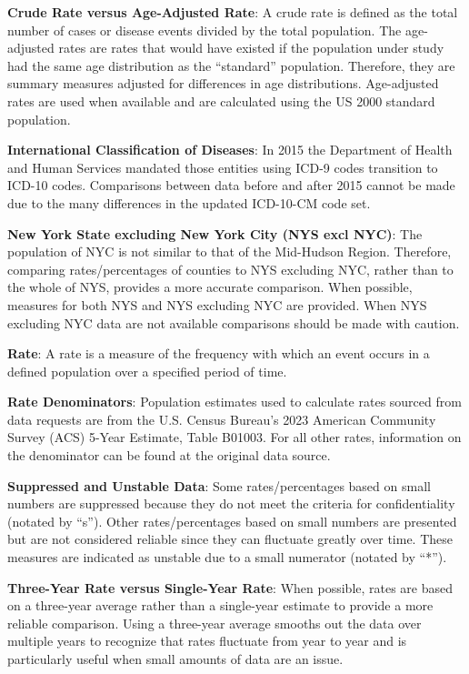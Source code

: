 \documentclass[
  english,
  letterpaper,
]{report}
\begin{document}
\textbf{Crude Rate versus Age-Adjusted Rate}: A crude rate is defined as
the total number of cases or disease events divided by the total
population. The age-adjusted rates are rates that would have existed if
the population under study had the same age distribution as the
``standard'' population. Therefore, they are summary measures adjusted
for differences in age distributions. Age-adjusted rates are used when
available and are calculated using the US 2000 standard population.

\textbf{International Classification of Diseases}: In 2015 the
Department of Health and Human Services mandated those entities using
ICD-9 codes transition to ICD-10 codes. Comparisons between data before
and after 2015 cannot be made due to the many differences in the updated
ICD-10-CM code set.

\textbf{New York State excluding New York City (NYS excl NYC)}: The
population of NYC is not similar to that of the Mid-Hudson Region.
Therefore, comparing rates/percentages of counties to NYS excluding NYC,
rather than to the whole of NYS, provides a more accurate comparison.
When possible, measures for both NYS and NYS excluding NYC are provided.
When NYS excluding NYC data are not available comparisons should be made
with caution.

\textbf{Rate}: A rate is a measure of the frequency with which an event
occurs in a defined population over a specified period of time.

\textbf{Rate Denominators}: Population estimates used to calculate rates
sourced from data requests are from the U.S. Census Bureau's 2023
American Community Survey (ACS) 5-Year Estimate, Table B01003. For all
other rates, information on the denominator can be found at the original
data source.

\textbf{Suppressed and Unstable Data}: Some rates/percentages based on
small numbers are suppressed because they do not meet the criteria for
confidentiality (notated by ``s''). Other rates/percentages based on
small numbers are presented but are not considered reliable since they
can fluctuate greatly over time. These measures are indicated as
unstable due to a small numerator (notated by ``*'').

\textbf{Three-Year Rate versus Single-Year Rate}: When possible, rates
are based on a three-year average rather than a single-year estimate to
provide a more reliable comparison. Using a three-year average smooths
out the data over multiple years to recognize that rates fluctuate from
year to year and is particularly useful when small amounts of data are
an issue.
\end{document}
